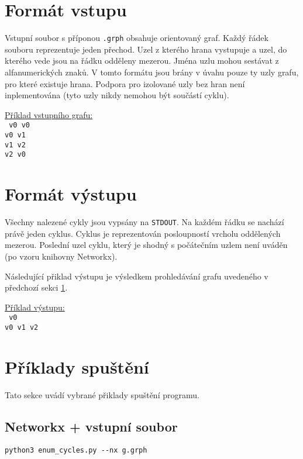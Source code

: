     \section{Formát vstupu}
        \label{sec:input}
        Vstupní soubor s příponou \texttt{.grph} obsahuje orientovaný graf. Každý řádek souboru reprezentuje jeden přechod. Uzel z kterého hrana vystupuje a uzel, do kterého vede jsou na řádku odděleny mezerou. Jména uzlu mohou sestávat z alfanumerických znaků. V tomto formátu jsou brány v úvahu pouze ty uzly grafu, pro které existuje hrana. Podpora pro izolované uzly bez hran není inplementována (tyto uzly nikdy nemohou být součástí cyklu).

        \vspace*{1em}
        \noindent \underline{Příklad vstupního grafu:}
        \vspace*{0.5em}\\
        \noindent\texttt{
            v0 v0\\
            v0 v1\\
            v1 v2\\
            v2 v0
        }

    \section{Formát výstupu}
        Všechny nalezené cykly jsou vypsány na \texttt{STDOUT}. Na každém řádku se nachází právě jeden cyklus. Cyklus je reprezentován posloupností vrcholu oddělených mezerou. Poslední uzel cyklu, který je shodný s počátečním uzlem není uváděn (po vzoru knihovny Networkx).

        Následující přiklad výstupu je výsledkem prohledávání grafu uvedeného v předchozí sekci \ref{sec:input}.

        \vspace*{1em}
        \noindent \underline{Příklad výstupu:}
        \vspace*{0.5em}\\
        \noindent\texttt{
            v0\\
            v0 v1 v2
        }

    \section{Příklady spuštění}
        Tato sekce uvádí vybrané přiklady spuštění programu.

        \subsection*{Networkx + vstupní soubor}
            \texttt{python3 enum\_cycles.py -{}-nx g.grph}


